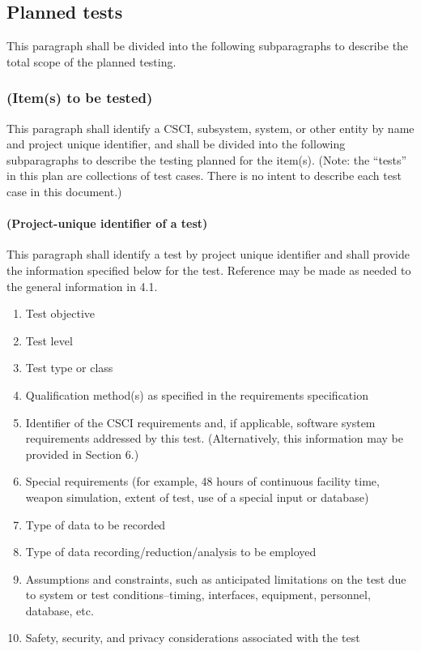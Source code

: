 \subsection{Planned tests}

This paragraph shall be divided into the following subparagraphs to
describe the total scope of the planned testing.

\subsubsection{(Item(s) to be tested)}

This paragraph shall identify a CSCI, subsystem, system, or other entity
by name and project unique identifier, and shall be divided into the
following subparagraphs to describe the testing planned for the item(s).
(Note: the ``tests'' in this plan are collections of test cases. There
is no intent to describe each test case in this document.)

\paragraph{(Project-unique identifier of a test)}

This paragraph shall identify a test by project unique identifier and
shall provide the information specified below for the test. Reference
may be made as needed to the general information in 4.1.

\begin{enumerate}
\itemsep1pt\parskip0pt
\item
  Test objective
\item
  Test level
\item
  Test type or class
\item
  Qualification method(s) as specified in the requirements specification
\item
  Identifier of the CSCI requirements and, if applicable, software
  system requirements addressed by this test. (Alternatively, this
  information may be provided in Section 6.)
\item
  Special requirements (for example, 48 hours of continuous facility
  time, weapon simulation, extent of test, use of a special input or
  database)
\item
  Type of data to be recorded
\item
  Type of data recording/reduction/analysis to be employed
\item
  Assumptions and constraints, such as anticipated limitations on the
  test due to system or test conditions--timing, interfaces, equipment,
  personnel, database, etc.
\item
  Safety, security, and privacy considerations associated with the test
\end{enumerate}

